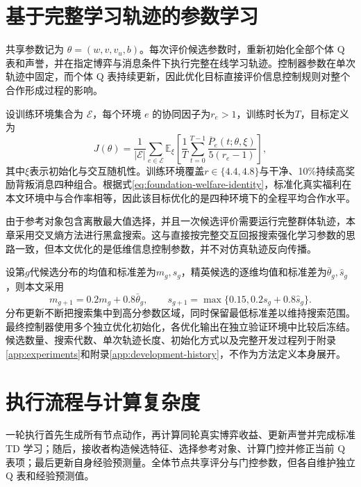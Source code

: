 \section{基于完整学习轨迹的参数学习}

共享参数记为 $\theta=(w,v,v_u,b)$。每次评价候选参数时，重新初始化全部个体 Q 表和声誉，并在指定博弈与消息条件下执行完整在线学习轨迹。控制器参数在单次轨迹中固定，而个体 Q 表持续更新，因此优化目标直接评价信息控制规则对整个合作形成过程的影响。

设训练环境集合为 $\mathcal E$，每个环境 $e$ 的协同因子为$r_e>1$，训练时长为$T$，目标定义为
\begin{equation}
 J(\theta)=\frac{1}{|\mathcal E|}\sum_{e\in\mathcal E}
 \mathbb E_{\xi}\left[\frac{1}{T}\sum_{t=0}^{T-1}
 \frac{\overline P_e(t;\theta,\xi)}{5(r_e-1)}\right],
 \label{eq:w2-objective}
\end{equation}
其中$\xi$表示初始化与交互随机性。训练环境覆盖$r\in\{4.4,4.8\}$与干净、10\%持续高奖励背叛消息四种组合。根据式\eqref{eq:foundation-welfare-identity}，标准化真实福利在本文环境中与合作率相等，因此该目标优化的是四种环境下的全程平均合作水平。

由于参考对象包含离散最大值选择，并且一次候选评价需要运行完整群体轨迹，本章采用交叉熵方法进行黑盒搜索\cite{deboer2005tutorial}。这与直接按完整交互回报搜索强化学习参数的思路一致\cite{salimans2017evolution}，但本文优化的是低维信息控制参数，并不对仿真轨迹反向传播。

设第$g$代候选分布的均值和标准差为$m_g,s_g$，精英候选的逐维均值和标准差为$\bar\theta_g,\widehat s_g$，则本文采用
\begin{equation}
 m_{g+1}=0.2m_g+0.8\bar\theta_g,\qquad
 s_{g+1}=\max\{0.15,0.2s_g+0.8\widehat s_g\}.
 \label{eq:w2-cem}
\end{equation}
分布更新不断把搜索集中到高分参数区域，同时保留最低标准差以维持搜索范围。最终控制器使用多个独立优化初始化，各优化输出在独立验证环境中比较后冻结。候选数量、搜索代数、单次轨迹长度、初始化方式以及完整开发过程列于附录\ref{app:experiments}和附录\ref{app:development-history}，不作为方法定义本身展开。

\section{执行流程与计算复杂度}

一轮执行首先生成所有节点动作，再计算同轮真实博弈收益、更新声誉并完成标准 TD 学习；随后，接收者构造候选特征、选择参考对象、计算门控并修正当前 Q 表项；最后更新自身经验预测量。全体节点共享评分与门控参数，但各自维护独立 Q 表和经验预测值。


